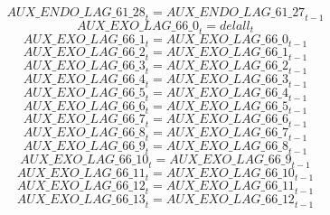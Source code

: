 \begin{dmath}
{AUX\_ENDO\_LAG\_61\_28}_{t}={AUX\_ENDO\_LAG\_61\_27}_{t-1}
\end{dmath}
\begin{dmath}
{AUX\_EXO\_LAG\_66\_0}_{t}={delall}_{t}
\end{dmath}
\begin{dmath}
{AUX\_EXO\_LAG\_66\_1}_{t}={AUX\_EXO\_LAG\_66\_0}_{t-1}
\end{dmath}
\begin{dmath}
{AUX\_EXO\_LAG\_66\_2}_{t}={AUX\_EXO\_LAG\_66\_1}_{t-1}
\end{dmath}
\begin{dmath}
{AUX\_EXO\_LAG\_66\_3}_{t}={AUX\_EXO\_LAG\_66\_2}_{t-1}
\end{dmath}
\begin{dmath}
{AUX\_EXO\_LAG\_66\_4}_{t}={AUX\_EXO\_LAG\_66\_3}_{t-1}
\end{dmath}
\begin{dmath}
{AUX\_EXO\_LAG\_66\_5}_{t}={AUX\_EXO\_LAG\_66\_4}_{t-1}
\end{dmath}
\begin{dmath}
{AUX\_EXO\_LAG\_66\_6}_{t}={AUX\_EXO\_LAG\_66\_5}_{t-1}
\end{dmath}
\begin{dmath}
{AUX\_EXO\_LAG\_66\_7}_{t}={AUX\_EXO\_LAG\_66\_6}_{t-1}
\end{dmath}
\begin{dmath}
{AUX\_EXO\_LAG\_66\_8}_{t}={AUX\_EXO\_LAG\_66\_7}_{t-1}
\end{dmath}
\begin{dmath}
{AUX\_EXO\_LAG\_66\_9}_{t}={AUX\_EXO\_LAG\_66\_8}_{t-1}
\end{dmath}
\begin{dmath}
{AUX\_EXO\_LAG\_66\_10}_{t}={AUX\_EXO\_LAG\_66\_9}_{t-1}
\end{dmath}
\begin{dmath}
{AUX\_EXO\_LAG\_66\_11}_{t}={AUX\_EXO\_LAG\_66\_10}_{t-1}
\end{dmath}
\begin{dmath}
{AUX\_EXO\_LAG\_66\_12}_{t}={AUX\_EXO\_LAG\_66\_11}_{t-1}
\end{dmath}
\begin{dmath}
{AUX\_EXO\_LAG\_66\_13}_{t}={AUX\_EXO\_LAG\_66\_12}_{t-1}
\end{dmath}
